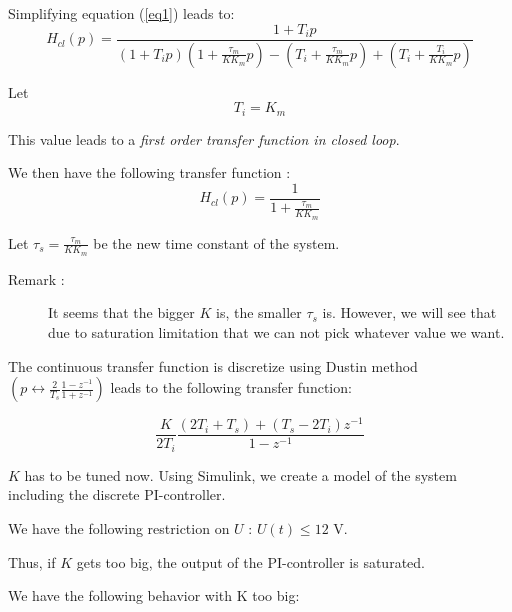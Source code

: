 Simplifying equation (\ref{eq1}) leads to: 
\begin{equation} \label{contTransfertPI} H_{cl}(p) = \frac{1 + T_i p}{(1+T_i p)(1+\frac{\tau_{m}}{K K_m} p) - (T_i + \frac{\tau_m}{K K_m}p) + (T_i + \frac{T_i}{K K_m}p)} \end{equation} 

Let \begin{equation} \label{valueTi} T_i = K_m \end{equation}

This value leads to a \emph{first order transfer function in closed loop}.

We then have the following transfer function : \begin{equation} H_{cl}(p) = \frac{1}{1 + \frac{\tau_m}{K K_m}} \end{equation}

Let $\tau_{s} = \frac{\tau_m}{K K_m}$ be the new time constant of the system.

\begin{description} \item[Remark :] It seems that the bigger $K$ is, the smaller $\tau_{s}$ is. 
  However, we will see that due to saturation limitation that we can not pick whatever value we want. \end{description}

The continuous transfer function is discretize using Dustin method $\left(p \leftrightarrow \frac{2}{T_s} \frac{1-z^{-1}}{1 + z^{-1}}\right)$ leads to the following transfer function:

\begin{equation} \label{disTransferPI} \frac{K}{2 T_i} \frac{(2 T_i + T_s) + (T_s - 2 T_i) z^{-1} }{ 1 - z^{-1} } \end{equation}

$K$ has to be tuned now. Using Simulink, we create a model of the system including the discrete PI-controller. 

We have the following restriction on $U$ : $U(t) \leq 12 \text{ V}$.

Thus, if $K$ gets too big, the output of the PI-controller is saturated. 

We have the following behavior with K too big:

